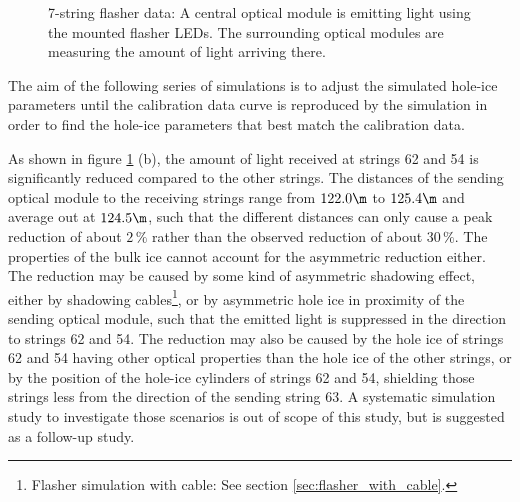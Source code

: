 \begin{figure}[htbp]
  \hfill
  \caption{7-string flasher data: A central optical module is emitting light using the mounted flasher LEDs. The surrounding optical modules are measuring the amount of light arriving there.}
  \label{fig:ea9Zieh0}
\end{figure}

The aim of the following series of simulations is to adjust the simulated hole-ice parameters until the calibration data curve is reproduced by the simulation in order to find the hole-ice parameters that best match the calibration data.


As shown in figure \ref{fig:ea9Zieh0} (b), the amount of light received at strings 62 and 54 is significantly reduced compared to the other strings. The distances of the sending optical module to the receiving strings range from $122.0\m$ to $125.4\m$ and average out at $124.5\m$, such that the different distances can only cause a peak reduction of about $2\,\%$ rather than the observed reduction of about $30\,\%$.
The properties of the bulk ice cannot account for the asymmetric reduction either.
The reduction may be caused by some kind of asymmetric shadowing effect, either by shadowing cables\footnote{Flasher simulation with cable: See section \ref{sec:flasher_with_cable}.}, or by asymmetric hole ice in proximity of the sending optical module, such that the emitted light is suppressed in the direction to strings 62 and 54. The reduction may also be caused by the hole ice of strings 62 and 54 having other optical properties than the hole ice of the other strings, or by the position of the hole-ice cylinders of strings 62 and 54, shielding those strings less from the direction of the sending string 63. A systematic simulation study to investigate those scenarios is out of scope of this study, but is suggested as a follow-up study.\followup

